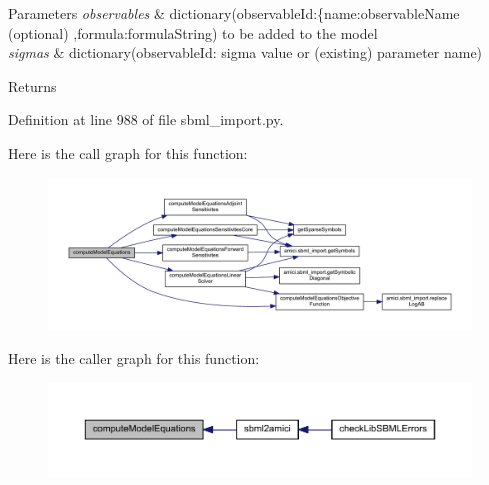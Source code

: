 \begin{DoxyParams}{Parameters}
{\em observables} & dictionary(observable\+Id\+:\{\textquotesingle{}name\textquotesingle{}\+:observable\+Name (optional) ,\textquotesingle{}formula\textquotesingle{}\+:formula\+String) to be added to the model \\
\hline
{\em sigmas} & dictionary(observable\+Id\+: sigma value or (existing) parameter name)\\
\hline
\end{DoxyParams}
\begin{DoxyReturn}{Returns}

\end{DoxyReturn}


Definition at line 988 of file sbml\+\_\+import.\+py.

Here is the call graph for this function\+:
\nopagebreak
\begin{figure}[H]
\begin{center}
\leavevmode
\includegraphics[width=350pt]{classamici_1_1sbml__import_1_1_sbml_importer_a028d8f30b90a236b7f5e8335a6e87ff4_cgraph}
\end{center}
\end{figure}
Here is the caller graph for this function\+:
\nopagebreak
\begin{figure}[H]
\begin{center}
\leavevmode
\includegraphics[width=350pt]{classamici_1_1sbml__import_1_1_sbml_importer_a028d8f30b90a236b7f5e8335a6e87ff4_icgraph}
\end{center}
\end{figure}
\mbox{\label{classamici_1_1sbml__import_1_1_sbml_importer_a8d851cd7e0fd6f00e3c85e615de3f796}} 
